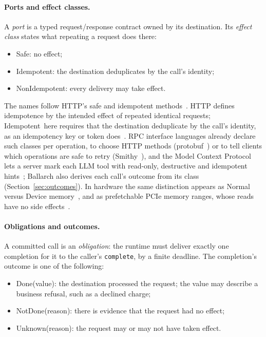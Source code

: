 \documentclass[11pt]{article}
\theoremstyle{definition}
\theoremstyle{plain}
\newcommand{\Done}{\textsf{Done}}
\newcommand{\NotDone}{\textsf{NotDone}}
\newcommand{\Unknown}{\textsf{Unknown}}
\newcommand{\Safe}{\textsf{Safe}}
\newcommand{\Idem}{\textsf{Idempotent}}
\newcommand{\NonIdem}{\textsf{NonIdempotent}}
\begin{document}
\paragraph{Ports and effect classes.} A \emph{port} is a typed request/response contract owned by its destination. Its \emph{effect class} states what repeating a request does there:
\begin{itemize}[nosep]
  \item \Safe: no effect;
  \item \Idem: the destination deduplicates by the call's identity;
  \item \NonIdem: every delivery may take effect.
\end{itemize}
The names follow HTTP's safe and idempotent methods~\citep{rfc9110}. HTTP defines idempotence by the intended effect of repeated identical requests; \Idem\ here requires that the destination deduplicate by the call's identity, as an idempotency key or token does~\citep{Leach2017Idempotency,Smithy}. RPC interface languages already declare such classes per operation, to choose HTTP methods (protobuf~\citep{ProtobufDescriptor}) or to tell clients which operations are safe to retry (Smithy~\citep{Smithy}), and the Model Context Protocol lets a server mark each LLM tool with read-only, destructive and idempotent hints~\citep{MCPTools}; Ballarch also derives each call's outcome from its class (Section~\ref{sec:outcomes}). In hardware the same distinction appears as Normal versus Device memory~\citep{ArmARM}, and as prefetchable PCIe memory ranges, whose reads have no side effects~\citep{PCIe7}.

\paragraph{Obligations and outcomes.} A committed call is an \emph{obligation}: the runtime must deliver exactly one completion for it to the caller's \texttt{complete}, by a finite deadline. The completion's outcome is one of the following:
\begin{itemize}[nosep]
  \item \Done(value): the destination processed the request; the value may describe a business refusal, such as a declined charge;
  \item \NotDone(reason): there is evidence that the request had no effect;
  \item \Unknown(reason): the request may or may not have taken effect.
\end{itemize}
\end{document}
